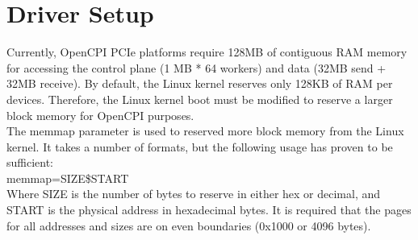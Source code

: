 \section{Driver Setup}
\begin{flushleft}
Currently, OpenCPI PCIe platforms require 128MB of contiguous RAM memory for accessing the control plane (1 MB * 64 workers) and data (32MB send + 32MB receive). By default, the Linux kernel reserves only 128KB of RAM per devices. Therefore, the Linux kernel boot must be modified to reserve a larger block memory for OpenCPI purposes. \\ \medskip
The memmap parameter is used to reserved more block memory from the Linux kernel. It takes a number of formats, but the following usage has proven to be sufficient: \\
\bigskip
	memmap=SIZE\$START \\
\bigskip
Where SIZE is the number of bytes to reserve in either hex or decimal, and
START is the physical address in hexadecimal bytes. It is required that the pages for all addresses and sizes are on even boundaries (0x1000 or 4096 bytes). \\

\end{flushleft}
